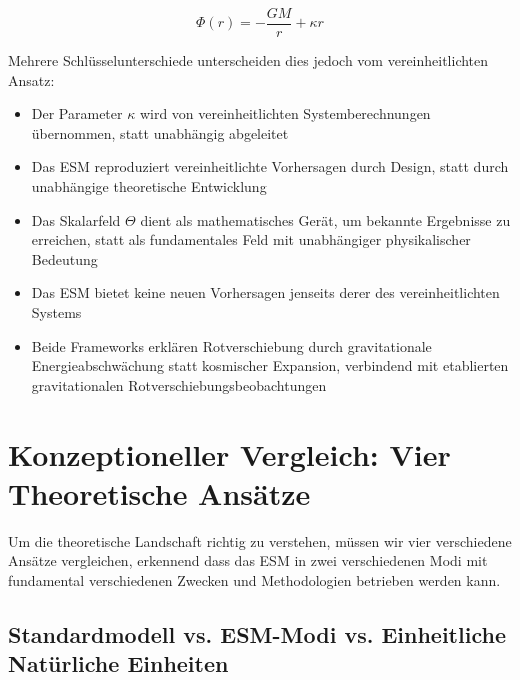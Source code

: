 \documentclass[12pt,a4paper]{article}
\begin{document}
	\begin{equation}
		\Phi(r) = -\frac{GM}{r} + \kappa r
	\end{equation}
	
	Mehrere Schlüsselunterschiede unterscheiden dies jedoch vom vereinheitlichten Ansatz:
	
	\begin{itemize}
		\item Der Parameter $\kappa$ wird von vereinheitlichten Systemberechnungen übernommen, statt unabhängig abgeleitet
		\item Das ESM reproduziert vereinheitlichte Vorhersagen durch Design, statt durch unabhängige theoretische Entwicklung
		\item Das Skalarfeld $\Theta$ dient als mathematisches Gerät, um bekannte Ergebnisse zu erreichen, statt als fundamentales Feld mit unabhängiger physikalischer Bedeutung
		\item Das ESM bietet keine neuen Vorhersagen jenseits derer des vereinheitlichten Systems
		\item Beide Frameworks erklären Rotverschiebung durch gravitationale Energieabschwächung statt kosmischer Expansion, verbindend mit etablierten gravitationalen Rotverschiebungsbeobachtungen
	\end{itemize}
	
	\section{Konzeptioneller Vergleich: Vier Theoretische Ansätze}
	\label{sec:four_framework_comparison}
	
	Um die theoretische Landschaft richtig zu verstehen, müssen wir vier verschiedene Ansätze vergleichen, erkennend dass das ESM in zwei verschiedenen Modi mit fundamental verschiedenen Zwecken und Methodologien betrieben werden kann.
	
	\subsection{Standardmodell vs. ESM-Modi vs. Einheitliche Natürliche Einheiten}
	\label{subsec:four_way_comparison}
	
\end{document}
